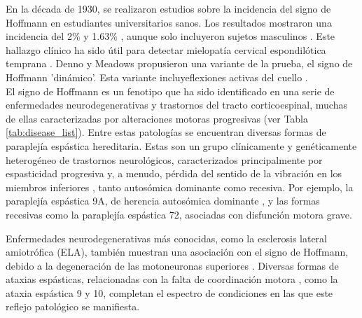 En la década de 1930, se realizaron estudios sobre la incidencia del signo de Hoffmann en estudiantes universitarios sanos. Los resultados mostraron una incidencia del 2\% y 1.63\% \cite{echols1936hoffmann} \cite{fay1933clinical}, aunque solo incluyeron sujetos masculinos \cite{glaser2001cervical}. Este hallazgo clínico ha sido útil para detectar mielopatía cervical espondilótica temprana \cite{denno1991early}. Denno y Meadows propusieron una variante de la prueba, el signo de Hoffmann 'dinámico'. Esta variante incluyeflexiones activas del cuello \cite{glaser2001cervical}.
\\
El signo de Hoffmann es un fenotipo que ha sido identificado en una serie de enfermedades neurodegenerativas y trastornos del tracto corticoespinal, muchas de ellas caracterizadas por alteraciones motoras progresivas (ver Tabla \ref{tab:disease_list}). Entre estas patologías se encuentran diversas formas de paraplejía espástica hereditaria. Estas son un grupo clínicamente y genéticamente heterogéneo de trastornos neurológicos, caracterizados principalmente por espasticidad progresiva y, a menudo, pérdida del sentido de la vibración en los miembros inferiores \cite{Esteves2014}, tanto autosómica dominante como recesiva. Por ejemplo, la paraplejía espástica 9A, de herencia autosómica dominante \cite{10.1093/brain/awv143}, y las formas recesivas como la paraplejía espástica 72, asociadas con disfunción motora grave.

Enfermedades neurodegenerativas más conocidas, como la esclerosis lateral amiotrófica (ELA), también muestran una asociación con el signo de Hoffmann, debido a la degeneración de las motoneuronas superiores \cite{RIANCHO201927}. Diversas formas de ataxias espásticas, relacionadas con la falta de coordinación motora \cite{Pedroso2022}, como la ataxia espástica 9 y 10, completan el espectro de condiciones en las que este reflejo patológico se manifiesta.

